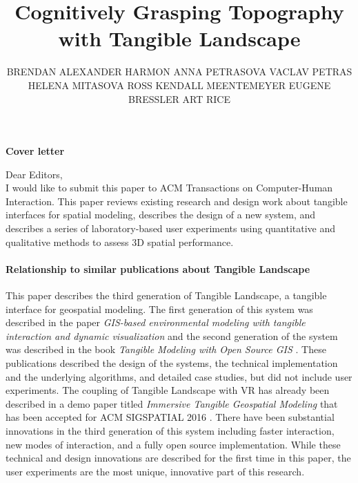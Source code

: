 \documentclass[prodmode,acmtochi]{acmsmall} %
\begin{document}

\title{Cognitively Grasping Topography with Tangible Landscape}
\author{BRENDAN ALEXANDER HARMON
ANNA PETRASOVA
VACLAV PETRAS
HELENA MITASOVA
ROSS ​KENDALL MEENTEMEYER
EUGENE BRESSLER
ART RICE
}

\maketitle

\textbf{Cover letter}

\vspace*{1em}

Dear Editors,\\

I would like to submit this paper 
to ACM Transactions on Computer-Human Interaction. 
%
This paper 
reviews existing research and design work about 
tangible interfaces for spatial modeling,  
describes the design of a new system, 
and describes a series of 
laboratory-based user experiments
using quantitative and qualitative methods
to assess 3D spatial performance.



\paragraph{Relationship to similar publications about Tangible Landscape}

This paper describes the third generation of Tangible Landscape,
a tangible interface for geospatial modeling. 
The first generation of this system was described in the paper 
\emph{GIS-based environmental modeling with tangible interaction and dynamic visualization} \cite{Petrasova2014}
and the second generation of the system was described in the book
\emph{Tangible Modeling with Open Source GIS}
\cite{Petrasova2015}. 
%
These publications described the design of the systems, the technical implementation and the underlying algorithms, and detailed case studies, but did not include user experiments.
%
The coupling of Tangible Landscape with VR
has already been described in a demo paper titled
\emph{Immersive Tangible Geospatial Modeling}
that has been accepted for ACM SIGSPATIAL 2016 \cite{Tabrizian2016}. 
%
There have been substantial innovations 
in the third generation of this system 
including 
faster interaction, 
new modes of interaction, 
and a fully open source implementation. 
%
While these technical and design innovations 
are described for the first time in this paper,
the user experiments are the most unique, innovative part of this research. 
\end{document}
